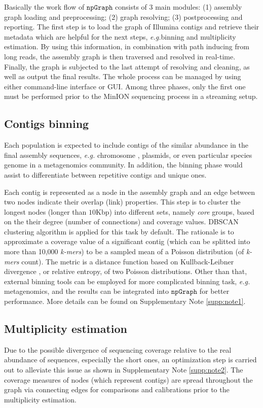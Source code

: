 \documentclass[10pt,twocolumn,twoside]{genpaper}
\newcommand{\npgraph}{$\mathtt{npGraph}$}
\newcommand{\EG}{\emph{e.g.}}
\begin{document}
Basically the work flow of \npgraph{} consists of 3 main modules: (1) assembly graph loading and preprocessing; (2) graph resolving; (3) postprocessing and reporting. 
The first step is to load the graph of Illumina contigs and retrieve their metadata which are helpful for the next steps, \EG binning and multiplicity estimation.
By using this information, in combination with path inducing from long reads, the assembly graph is then traversed and resolved in real-time.
Finally, the graph is subjected to the last attempt of resolving and cleaning, as well as output the final results. The whole process can be managed by using either command-line interface or GUI.
Among three phases, only the first one must be performed prior to the MinION sequencing process in a streaming setup.
\subsection*{Contigs binning}
Each population is expected to include contigs of the similar abundance in the final assembly sequences, \EG{} chromosome , plasmids, or even particular species genome in a metagenomics community. In addition, the binning phase would assist to differentiate between repetitive contigs and unique ones. 

Each contig is represented as a node in the assembly graph and an edge between two nodes indicate their overlap (link) properties.
This step is to cluster the longest nodes (longer than $10$Kbp) into different sets, namely \emph{core} groups, based on the their degree (number of connections) and coverage values.
DBSCAN clustering algorithm \cite{Ester96adensity-based} is applied for this task by default.
The rationale is to approximate a coverage value of a significant contig (which can be splitted into more than 10,000 \emph{k-mers}) to be a sampled mean of a Poisson distribution (of \emph{k-mers} count). 
The metric is a distance function based on Kullback-Leibner divergence \cite{Kullback1951information}, or relative entropy, of two Poisson distributions. Other than that, external binning tools can be employed for more complicated binning task, \EG{} metagenomics, and the results can be integrated into \npgraph{} for better performance. More details can be found on Supplementary Note \ref{supp:note1}.

\subsection*{Multiplicity estimation}
Due to the possible divergence of sequencing coverage relative to the real abundance of sequences, especially the short ones, an optimization step is carried out to alleviate this issue as shown in Supplementary Note \ref{supp:note2}. The coverage measures of nodes (which represent contigs) are spread throughout the graph via connecting edges for comparisons and calibrations prior to the multiplicity estimation. 
\end{document}
